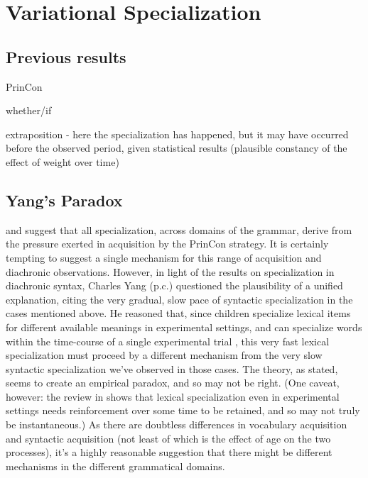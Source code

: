 \documentclass{artikel3}
\begin{document}
\section{Variational Specialization}

\subsection{Previous results}

PrinCon

whether/if

extraposition - here the specialization has happened, but it may have occurred before the observed period, given statistical results (plausible constancy of the effect of weight over time)


\subsection{Yang's Paradox}

\citet{wallenberg2016} and \citet{fruehwaldwallenberginprep} suggest that all specialization, across domains of the grammar, derive from the pressure exerted in acquisition by the PrinCon strategy. It is certainly tempting to suggest a single mechanism for this range of acquisition and diachronic observations. However, in light of the results on specialization in diachronic syntax, Charles Yang (p.c.) questioned the plausibility of a unified explanation, citing the very gradual, slow pace of syntactic specialization in the cases mentioned above. He reasoned that, since children specialize lexical items for different available meanings in experimental settings, and can specialize words within the time-course of a single experimental trial \citep[e.g. the classic study][]{markmanwachtel1988}, this very fast lexical specialization must proceed by a different mechanism from the very slow syntactic specialization we've observed in those cases. The theory, as stated, seems to create an empirical paradox, and so may not be right. (One caveat, however: the review in \citealt{bionetal2013} shows that lexical specialization even in experimental settings needs reinforcement over some time to be retained, and so may not truly be instantaneous.) As there are doubtless differences in vocabulary acquisition and syntactic acquisition (not least of which is the effect of age on the two processes), it's a highly reasonable suggestion that there might be different mechanisms in the different grammatical domains.
\end{document}
